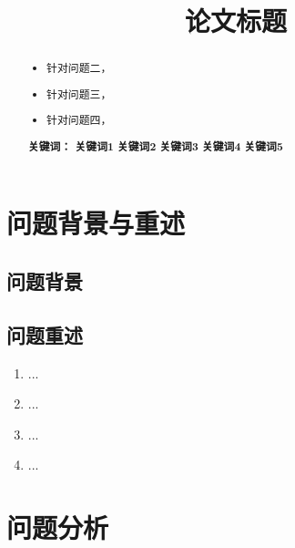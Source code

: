 \documentclass[a4paper]{article}
\title{论文标题}
\date{} %
\begin{document}
	\maketitle
	\vspace{-6em} %
	\begin{abstract}
		\noindent %
		\begin{itemize}[leftmargin=0.5cm, itemsep=0pt] %
			\item 针对问题二，
			\item 针对问题三，
			\item 针对问题四，
		\end{itemize}
		\noindent %
		\textbf{关键词：} \textbf{关键词1} \quad \textbf{关键词2} \quad \textbf{关键词3} \quad \textbf{关键词4} \quad \textbf{关键词5}
	\end{abstract}
	
	\clearpage %
	
	\section{问题背景与重述}
	\subsection{问题背景}
 
	
	\subsection{问题重述}
	\begin{enumerate}[itemindent=0.5cm]
		\item ...
		\item ...
		\item ...
		\item ...
	\end{enumerate}
	
	\section{问题分析}
\end{document}
